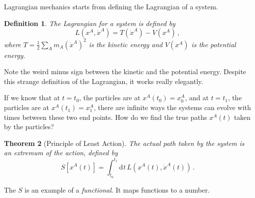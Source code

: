 \documentclass{article}
\theoremstyle{plain}\theoremheaderfont{\normalfont\itshape}\theorembodyfont{\rmfamily}\theoremseparator{.}\newtheorem*{rem}{Remark}\newtheorem*{ex}{Example}\newtheorem*{proof}{Proof}\newtheorem*{altp}{Alternative proof}
\theoremstyle{plain}\theoremheaderfont{\normalfont\bfseries}\theorembodyfont{\rmfamily}\theoremseparator{.}\newtheorem{thm}{Theorem}[section]\newtheorem{lem}[thm]{Lemma}\newtheorem{prop}[thm]{Proposition}\newtheorem*{cor}{Corollary}\newtheorem{defn}[thm]{Definition}\newtheorem{clm}[thm]{Claim}\newtheorem{clminproof}{Claim}\newtheorem*{law}{Law}\newtheorem{pos}[thm]{Postulate}
\theoremstyle{break}\theoremheaderfont{\normalfont\itshape}\theorembodyfont{\rmfamily}\theoremseparator{.\medskip}\newtheorem*{proofskip}{Proof}\newtheorem*{exs}{Examples}\newtheorem*{rems}{Remarks}
\theoremstyle{break}\theoremheaderfont{\normalfont\bfseries}\theorembodyfont{\rmfamily}\theoremseparator{.\medskip}\newtheorem{lemskip}[thm]{Lemma}\newtheorem{defnskip}[thm]{Definition}\newtheorem{propskip}[thm]{Proposition}\newtheorem{thmskip}[thm]{Theorem}
\numberwithin{equation}{section}
\newcommand{\dd}[2][]{\mathrm{d}^{#1} #2\,}
\begin{document}
    Lagrangian mechanics starts from defining the Lagrangian of a system.
    \begin{defn}
        The \textit{Lagrangian} for a system is defined by
        \begin{equation}
            L(x^A,\dot{x}^A)=T(\dot{x}^A)-V(x^A)\,,
        \end{equation}
        where \(T=\frac{1}{2}\sum_{A}m_A(\dot{x}^A)^2\) is the kinetic energy and \(V(x^A)\) is the potential energy.
    \end{defn}
    Note the weird minus sign between the kinetic and the potential energy. Despite this strange definition of the Lagrangian, it works really elegantly.

    If we know that at \(t=t_0\), the particles are at \(x^A(t_0)=x^A_0\), and at \(t=t_1\), the particles are at \(x^A(t_1)=x^A_1\), there are infinite ways the systems can evolve with times between these two end points. How do we find the true paths \(x^A(t)\) taken by the particles?
    \begin{thm}[Principle of Least Action]
        The actual path taken by the system is an extremum of the \textit{action}, defined by
        \begin{equation}
            S[x^A(t)]=\int_{t_0}^{t_1}\dd{t}L(x^A(t),\dot{x}^A(t))\,.
        \end{equation}
    \end{thm}
    The \(S\) is an example of a \textit{functional}. It maps functions to a number.
\end{document}
